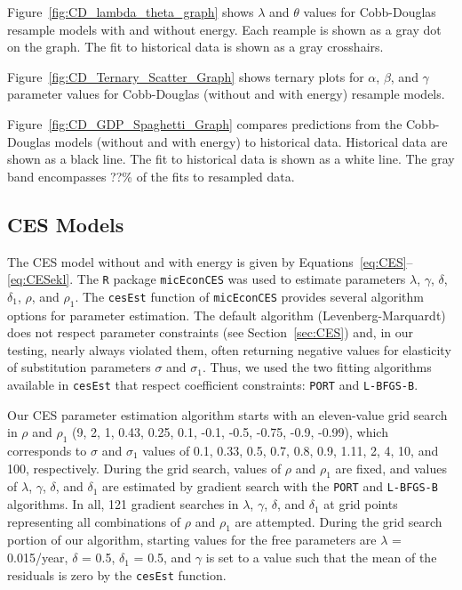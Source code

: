 \documentclass[preprint,authoryear,12pt]{elsarticle}\usepackage[]{graphicx}\usepackage[]{color}
\begin{document}
Figure~\ref{fig:CD_lambda_theta_graph} shows $\lambda$ and $\theta$ values
for Cobb-Douglas resample models with and without energy.
Each reample is shown as a gray dot on the graph. 
The fit to historical data is shown as a gray crosshairs.

Figure~\ref{fig:CD_Ternary_Scatter_Graph} shows ternary plots 
for $\alpha$, $\beta$, and $\gamma$ parameter values 
for Cobb-Douglas (without and with energy) resample models.

Figure~\ref{fig:CD_GDP_Spaghetti_Graph} compares predictions 
from the Cobb-Douglas models 
(without and with energy) to historical data.
Historical data are shown as a black line. 
The fit to historical data is shown as a white line.
The gray band encompasses ??\% of the fits to resampled data.



\twocolumn{}



\onecolumn{}


\subsection{CES Models}
\label{sec:CES_Parameter_Estimation}

The CES model without and with energy is given by 
Equations~\ref{eq:CES}--\ref{eq:CESekl}. 
The \texttt{R} \citep{R} package \texttt{micEconCES} 
\citep{Henningsen:2011td} was used to estimate parameters 
$\lambda$, $\gamma$, $\delta$, $\delta_1$, $\rho$, and $\rho_1$. 
The \texttt{cesEst} function of \texttt{micEconCES} provides 
several algorithm options for parameter estimation.
The default algorithm (Levenberg-Marquardt) does not respect
parameter constraints (see Section~\ref{sec:CES}) and, 
in our testing, nearly always violated them, often returning
negative values for elasticity of substitution parameters $\sigma$ and $\sigma_1$.
Thus, we used the two fitting algorithms available in \texttt{cesEst} that
respect coefficient constraints: \texttt{PORT} and \texttt{L-BFGS-B}. 

Our CES parameter estimation algorithm starts with an eleven-value grid search
in $\rho$ and $\rho_1$ (9, 2, 1, 0.43, 0.25, 0.1, -0.1, -0.5, -0.75, -0.9, -0.99),
which corresponds to $\sigma$ and $\sigma_1$ values of
0.1, 0.33, 0.5, 0.7, 0.8, 0.9, 1.11, 2, 4, 10, and 100, respectively.
During the grid search, values of $\rho$ and $\rho_1$ are fixed,
and values of $\lambda$, $\gamma$, $\delta$, and $\delta_1$ are estimated 
by gradient search with the \texttt{PORT} and \texttt{L-BFGS-B} algorithms.
In all, 121 gradient searches in $\lambda$, $\gamma$, $\delta$, and $\delta_1$
at grid points representing all combinations of $\rho$ and $\rho_1$ are attempted.
During the grid search portion of our algorithm, starting values for the free parameters
are $\lambda$ = 0.015/year, $\delta$ = 0.5, $\delta_1$ = 0.5, 
and $\gamma$ is set to a value such that the mean of the residuals is zero
by the \texttt{cesEst} function.
\end{document}
